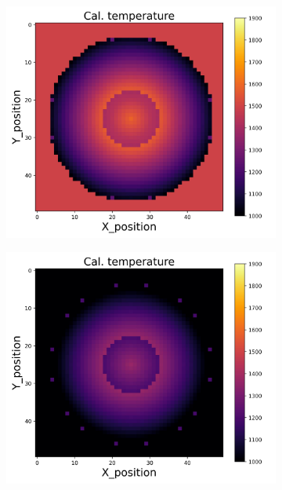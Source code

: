 {\begin{figure}[p]
\begin{minipage}{\textwidth}
\begin{subfigure}{0.325\textwidth}
        \end{subfigure}
        \begin{subfigure}{0.325\textwidth}
            \centering
            \includegraphics[width=\textwidth]{figures/raw_data/26/quad/T_cal.jpg}
        \end{subfigure}
        \begin{subfigure}{0.325\textwidth}
            \centering
            \includegraphics[width=\textwidth]{figures/raw_data/31/quad/T_cal.jpg}

\end{subfigure}
\end{minipage}
\end{figure}}
